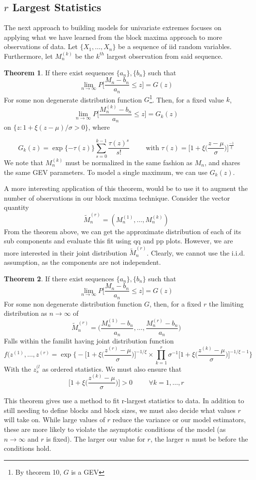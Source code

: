 \documentclass{article}
\theoremstyle{definition}
\newtheorem{theorem}{Theorem}
\theoremstyle{definition}
\def\Xs{\{X_1, \hdots, X_n\}}
\begin{document}
\subsection{$r$ Largest Statistics}
The next approach to building models for univariate extremes focuses on applying what we have learned from the block maxima approach to more observations of data. Let $\Xs$ be a sequence of iid random variables. Furthermore, let $M_n^{(k)}$ be the $k^{th}$ largest observation from said sequence.
\begin{theorem}
If there exist sequences $\{a_n\}, \{b_n\}$ such that 
\[\lim_{n\rightarrow \infty} P \bigg[ \frac{M_n-b_n}{a_n}\leq z \bigg]= G(z)\]
For some non degenerate distribution function $G$\footnote{By theorem 10, $G$ is a GEV}. Then, for a fixed value $k$,
\[\lim_{n\rightarrow \infty} P \bigg[ \frac{M_n^{(k)}-b_n}{a_n}\leq z \bigg]= G_k(z)\]
on $\{z:1+\xi(z-\mu)/\sigma > 0\}$, where

\[G_k(z)=\exp\{-\tau(z)\}\sum_{s=0}^{k-1}\frac{\tau(z)^s}{s!} \hspace{1cm} \text{with }\tau(z)=\bigg[1+\xi\bigg(\frac{z-\mu}{\sigma}\bigg)\bigg]^{\frac{-1}{\xi}} \]
We note that $M_n^{(k)}$ must be normalized in the same fashion as $M_n$, and shares the same GEV parameters. To model a single maximum, we can use $G_k(z)$.
\end{theorem}
A more interesting application of this theorem, would be to use it to augment the number of observations in our block maxima technique. Consider the vector quantity
\[\tilde{M}_n^{(r)} = (M_n^{(1)},\hdots, M_n^{(k)})\]
From the theorem above, we can get the approximate distribution of each of its sub components and evaluate this fit using qq and pp plots. However, we are more interested in their joint distribution $\tilde{M}_n^{(r)}$. Clearly, we cannot use the i.i.d. assumption, as the components are not independent.
\begin{theorem}
If there exist sequences $\{a_n\},\{b_n\}$ such that 
\[\lim_{n\rightarrow \infty} P \bigg[ \frac{M_n-b_n}{a_n}\leq z \bigg]= G(z)\]
For some non degenerate distribution function $G$, then, for a fixed $r$ the limiting distribution as $n \rightarrow \infty$ of
\[\tilde{M}_n^{(r)}= \bigg(\frac{M_n^{(1)}-b_n}{a_n},\hdots, \frac{M_n^{(r)}-b_n}{a_n} \bigg)\]
Falls within the familit having joint distribution function 
\[f(z^{(1)}, \hdots,z^{(r)}= \exp \bigg\{ -\bigg[ 1+ \xi \bigg( \frac{z^{(r)} -\mu }{\sigma}\bigg)\bigg]^{-1/\xi}\times \prod_{k=1}^r \sigma^{-1} \bigg[ 1+ \xi \bigg( \frac{z^{(k)} -\mu }{\sigma}\bigg)\bigg]^{-1/\xi-1}\bigg\} \]
With the $z^{(l}_s$ as ordered statistics. We must also ensure that $$\bigg[ 1+ \xi \bigg( \frac{z^{(k)} -\mu }{\sigma}\bigg)\bigg] >0 \hspace{1cm} \forall k=1,\hdots,r $$
\end{theorem}
This theorem gives use a method to fit r-largest statistics to data. In addition to still needing to define blocks and block sizes, we must also decide what values $r$ will take on. While large values of $r$ reduce the variance or our model estimators, these are more likely to violate the asymptotic conditions of the model (as $n\rightarrow \infty$ and $r$ is fixed). The larger our value for $r$, the larger $n$ must be before the conditions hold.
\end{document}
